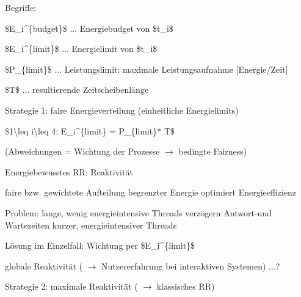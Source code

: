 \documentclass[a4paper]{article}
\begin{document}
\begin{multicols}{3}
    \begin{itemize*}
        \item
        Begriffe:
        \begin{itemize*}
            \item \$E\_i\^{}\{budget\}\$ ... Energiebudget von \$t\_i\$
            \item \$E\_i\^{}\{limit\}\$ ... Energielimit von \$t\_i\$
            \item \$P\_\{limit\}\$ ... Leistungslimit: maximale Leistungsaufnahme {[}Energie/Zeit{]}
            \item \$T\$ ... resultierende Zeitscheibenlänge
        \end{itemize*}
        \item
        Strategie 1: faire Energieverteilung (einheitliche Energielimits)
        \begin{itemize*}
            \item \$1\textbackslash leq i\textbackslash leq 4: E\_i\^{}\{limit\} = P\_\{limit\}* T\$
            \item (Abweichungen = Wichtung der Prozesse $\rightarrow$ bedingte Fairness)
        \end{itemize*}
    \end{itemize*}

    Energiebewusstes RR: Reaktivität

    \begin{itemize*}
        \item
        faire bzw. gewichtete Aufteilung begrenzter Energie optimiert
        Energieeffizienz
        \item
        Problem: lange, wenig energieintensive Threads verzögern Antwort-und
        Wartezeiten kurzer, energieintensiver Threads
        \begin{itemize*}
            \item Lösung im Einzelfall: Wichtung per \$E\_i\^{}\{limit\}\$
            \item globale Reaktivität ( $\rightarrow$ Nutzererfahrung bei interaktiven Systemen) ...?
        \end{itemize*}
        \item
        Strategie 2: maximale Reaktivität ( $\rightarrow$
        klassisches RR)
    \end{itemize*}


\end{multicols}
\end{document}
